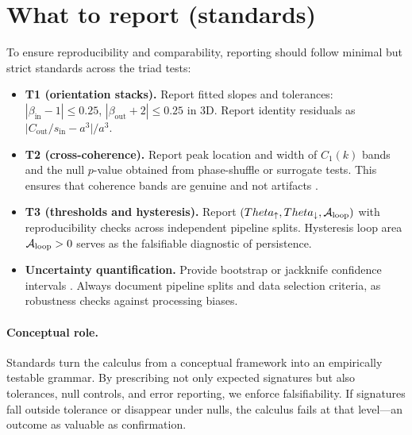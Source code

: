 \documentclass[12pt,a4paper,oneside]{scrreprt}
\def\Theta{Theta}%
\begin{document}
\section{What to report (standards)}\label{sec:quanta-report}

To ensure reproducibility and comparability, reporting should follow minimal but 
strict standards across the triad tests:

\begin{itemize}
  \item \textbf{T1 (orientation stacks).} 
  Report fitted slopes and tolerances: 
  $|\beta_{\mathrm{in}} - 1| \leq 0.25$, 
  $|\beta_{\mathrm{out}} + 2| \leq 0.25$ in 3D. 
  Report identity residuals as 
  $\big| C_{\mathrm{out}}/s_{\mathrm{in}} - a^3 \big| / a^3$.
  
  \item \textbf{T2 (cross-coherence).} 
  Report peak location and width of $C_1(k)$ bands and the null $p$-value 
  obtained from phase-shuffle or surrogate tests. 
  This ensures that coherence bands are genuine and not artifacts 
  \citep{Bendat2010Random,Theiler1992Testing}.
  
  \item \textbf{T3 (thresholds and hysteresis).} 
  Report $(\Theta_\uparrow, \Theta_\downarrow, \mathcal A_{\rm loop})$ 
  with reproducibility checks across independent pipeline splits. 
  Hysteresis loop area $\mathcal A_{\rm loop} > 0$ serves as the 
  falsifiable diagnostic of persistence.
  
  \item \textbf{Uncertainty quantification.} 
  Provide bootstrap or jackknife confidence intervals 
  \citep{Efron1993Bootstrap,Good2005Permutation}. 
  Always document pipeline splits and data selection criteria, 
  as robustness checks against processing biases. 
\end{itemize}

\paragraph{Conceptual role.} 
Standards turn the calculus from a conceptual framework into an 
empirically testable grammar. 
By prescribing not only expected signatures but also tolerances, 
null controls, and error reporting, we enforce falsifiability. 
If signatures fall outside tolerance or disappear under nulls, 
the calculus fails at that level—an outcome as valuable as confirmation.
\end{document}
